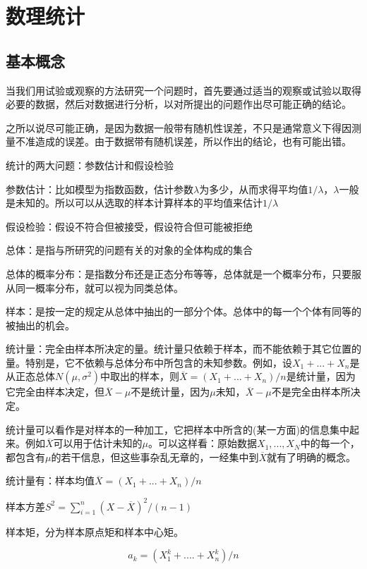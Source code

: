 \documentclass{ctexart}
\begin{document}
	
	
	\section{数理统计}
	
	\subsection{基本概念}
	当我们用试验或观察的方法研究一个问题时，首先要通过适当的观察或试验以取得必要的数据，然后对数据进行分析，以对所提出的问题作出尽可能正确的结论。
	
	之所以说尽可能正确，是因为数据一般带有随机性误差，不只是通常意义下得因测量不准造成的误差。由于数据带有随机误差，所以作出的结论，也有可能出错。
	
	统计的两大问题：参数估计和假设检验
	
	参数估计：比如模型为指数函数，估计参数\(\lambda\)为多少，从而求得平均值\(1/\lambda\)，\(\lambda\)一般是未知的。所以可以从选取的样本计算样本的平均值来估计\(1/\lambda\)
	
	假设检验：假设不符合但被接受，假设符合但可能被拒绝
	
	总体：是指与所研究的问题有关的对象的全体构成的集合
	
	总体的概率分布：是指数分布还是正态分布等等，总体就是一个概率分布，只要服从同一概率分布，就可以视为同类总体。
	
	样本：是按一定的规定从总体中抽出的一部分个体。总体中的每一个个体有同等的被抽出的机会。
	
	统计量：完全由样本所决定的量。统计量只依赖于样本，而不能依赖于其它位置的量。{\color{red}特别是，它不依赖与总体分布中所包含的未知参数}。例如，设\(X_1+...+X_n\)是从正态总体\(N(\mu, \sigma^2)\)中取出的样本，则\(\overline{X} = (X_1+...+X_n)/n\)是统计量，因为它完全由样本决定，但\(\overline{X}-\mu\)不是统计量，因为\(\mu\)未知，\(\overline{X}-\mu\)不是完全由样本所决定。
	
	统计量可以看作是对样本的一种加工，它把样本中所含的(某一方面)的信息集中起来。例如\(\overline{X}\)可以用于估计未知的\(\mu\)。可以这样看：原始数据\(X_1,...,X_N\)中的每一个，都包含有\(\mu\)的若干信息，但这些事杂乱无章的，一经集中到\(\overline{X}\)就有了明确的概念。
	
	统计量有：样本均值\(\overline{X}=(X_1+...+X_n)/n\)
	
	样本方差\(S^2=\sum_{i=1}^{n}(X-\overline{X})^2/(n-1)\)
	
	样本矩，分为样本原点矩和样本中心矩。
	
	\[a_k=(X_1^k+....+X_n^k)/n\]
	
\end{document}
